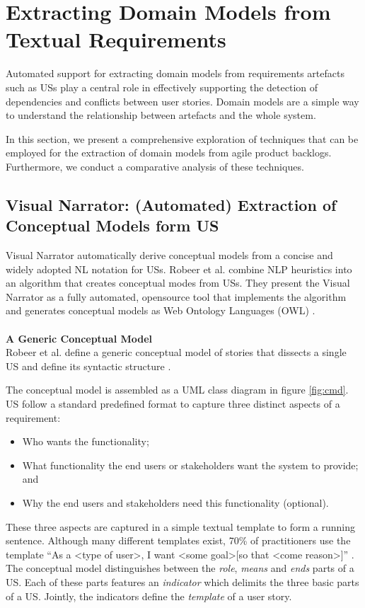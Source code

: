\section{Extracting Domain Models from Textual Requirements}\label{dmodel}
Automated support for extracting domain models from requirements artefacts such as USs play a central role in effectively supporting the detection of dependencies and conflicts between user stories. Domain models are a simple way to understand the relationship between artefacts and the whole system. 

In this section, we present a comprehensive exploration of techniques that can be employed for the extraction of domain models from agile product backlogs. Furthermore, we conduct a comparative analysis of these techniques. 
\subsection{Visual Narrator: (Automated) Extraction of Conceptual Models form US} \label{vnarrator}
Visual Narrator automatically derive conceptual models from a concise and widely adopted NL notation for USs. Robeer et al. combine NLP heuristics into an algorithm that creates conceptual modes from USs. They present the Visual Narrator as a fully automated, opensource tool that implements the algorithm and generates conceptual models as Web Ontology Languages (OWL) \cite{Robeer2016}.\\ \\ 
\textbf{A Generic Conceptual Model}\\
Robeer et al. define a generic conceptual model of stories that dissects a single US and define its syntactic structure \cite{Lucassen2015}. 

The conceptual model is assembled as a UML class diagram in figure \ref{fig:cmd}. US follow a standard predeﬁned format \cite{Wautelet2014} to capture three distinct aspects of a requirement:
\begin{itemize}
\item Who wants the functionality;
\item What functionality the end users or stakeholders want the system to provide; and 
\item Why the end users and stakeholders need this functionality (optional).
\end{itemize}
These three aspects are captured in a simple textual template to form a running sentence. Although many different templates exist, 70\% of practitioners use the template \enquote{As a \textless type of user\textgreater, I want \textless some goal\textgreater [so that \textless come reason\textgreater ]} \cite{Greer2004}. 
The conceptual model distinguishes between the \emph{role}, \emph{means} and \emph{ends} parts of a US. Each of these parts features an \emph{indicator} which delimits the three basic parts of a US. Jointly, the indicators deﬁne the \emph{template} of a user story.


